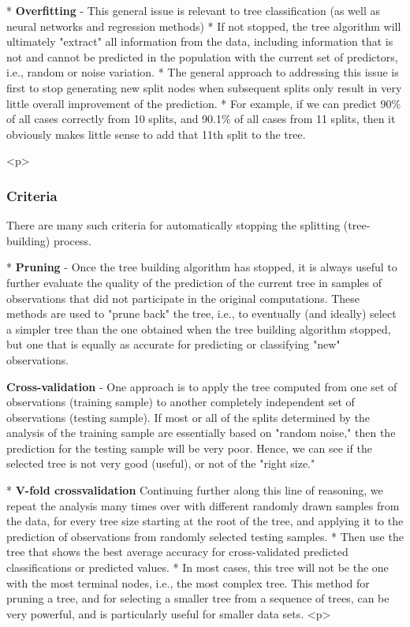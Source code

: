 * \textbf{Overfitting} -
This general issue is relevant to tree classification (as well as neural networks and regression methods)
*  If not stopped, the tree algorithm will ultimately "extract" all information from the data, including information that is not and cannot be predicted in the population with the current set of predictors, i.e., random or noise variation.
* The general approach to addressing this issue is first to stop generating new split nodes when subsequent splits only result in very little overall improvement of the prediction.
* For example, if we can predict 90\% of all cases correctly from 10 splits, and 90.1\% of all cases from 11 splits, then it obviously makes little sense to add that 11th split to the tree.

<p>
\subsubsection*{Criteria}
There are many such criteria for automatically stopping the splitting (tree-building) process.

* \textbf{Pruning} - Once the tree building algorithm has stopped, it is always useful to further evaluate the quality of the prediction of the current tree in samples of observations that did not participate in the original computations. These methods are used to "prune back" the tree, i.e., to eventually (and ideally) select a simpler tree than the one obtained when the tree building algorithm stopped, but one that is equally as accurate for predicting or classifying "new" observations.
\item
\textbf{Cross-validation} -  One approach is to apply the tree computed from one set of observations (training sample) to another completely independent set of observations (testing sample). If most or all of the splits determined by the analysis of the training sample are essentially based on "random noise," then the prediction for the testing sample will be very poor. Hence, we can see if the selected tree is not very good (useful), or not of the "right size."

* \textbf{V-fold crossvalidation} Continuing further along this line of reasoning, we repeat the analysis many times over with different randomly drawn samples from the data, for every tree size starting at the root of the tree, and applying it to the prediction of observations from randomly selected testing samples. 
* Then use the tree that shows the best average accuracy for cross-validated predicted classifications or predicted values.
* In most cases, this tree will not be the one with the most terminal nodes, i.e., the most complex tree. This method for pruning a tree, and for selecting a smaller tree from a sequence of trees, can be very powerful, and is particularly useful for smaller data sets. 
<p>



